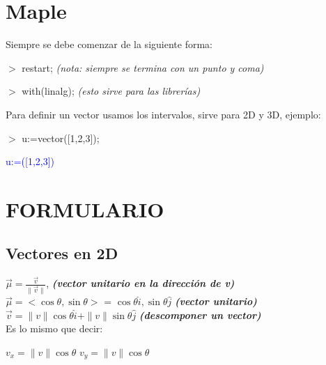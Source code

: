 \documentclass[letterpaper,12pt]{article}
\begin{document}
\begin{sloppypar}
\begin{center}
\end{center}






\section{Maple}
\begin{center}
    Siempre se debe comenzar de la siguiente forma:
\end{center}
\noindent $>$ \textcolor[rgb]{1,0,0}{restart;} \textit{(nota: siempre se termina con un punto y coma)}

\noindent $>$ \textcolor[rgb]{1,0,0}{with(linalg);} \textit{(esto sirve para las librerías)}
\begin{center}
    Para definir un vector usamos los intervalos, sirve para 2D y 3D, ejemplo:
\end{center}
\noindent $>$ \textcolor[rgb]{1,0,0}{u:=vector([1,2,3]);} 

\begin{center}
    \textcolor{blue}{u:=([1,2,3])}
\end{center}

\newpage
\centering
\section*{\textbf{FORMULARIO}}
\subsection*{\textbf{Vectores en 2D}}
$\displaystyle \vec{\mu} = \frac{\vec{v}}{\| \vec{v} \|}$, \textcolor[rgb]{0.2,0.5,0.7}{\textbf{\textit{(vector unitario en la dirección de v)}}}
\vspace{0.3cm}\\
$\vec{\mu} = <\cos \theta, \sin \theta>$ = $\cos \theta\hat{i}, \sin \theta\hat{j}$ \textcolor[rgb]{0.2,0.5,0.7}{\textbf{\textit{(vector unitario)}}}
\vspace{0.3cm}\\
$\vec{v} = \|v\|\cos \theta\hat{i} + \|v\|\sin \theta\hat{j}$ \textcolor[rgb]{0.2,0.5,0.7}{\textbf{\textit{(descomponer un vector)}}}
\vspace{0.3cm}\\
Es lo mismo que decir:

$v_x = \|v\| \cos\theta$ \hspace{0.4cm} $v_y = \|v\| \cos\theta$


\end{sloppypar}
\end{document}
